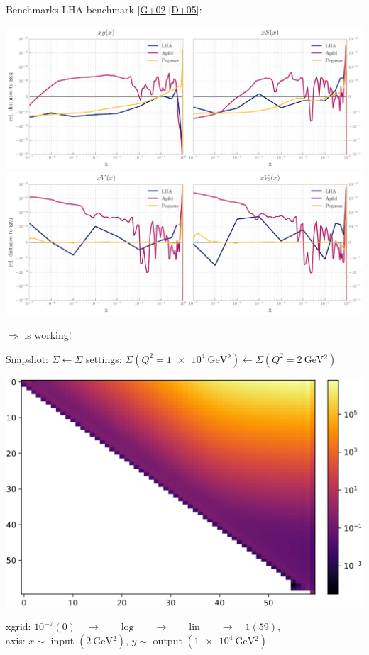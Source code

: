 \documentclass[10pt, usepdftitle=false]{beamer}
\providecommand{\iRef}[1]{{\color{mLightGreen}\small $[$#1$]$}}
\begin{document}
\begin{frame}{\eko{} Benchmarks}
	LHA benchmark \iRef{\href{https://arxiv.org/abs/hep-ph/0204316}{G+02}}\iRef{\href{https://arxiv.org/abs/hep-ph/0511119}{D+05}}:

	\begin{center}
		{\includegraphics[scale=0.5]{lha_bench_g_S.pdf}}%
	\quad%
		{\includegraphics[scale=0.5]{lha_bench_V_V3.pdf}}
	\end{center}

	$\Rightarrow$ \eko{} is working!
\end{frame}

\begin{frame}{\eko{} Snapshot: $\Sigma \leftarrow \Sigma$}
	\ffns{} \lo{} \lha{} settings: $\Sigma(Q^2=\SI{1e4}{\GeV^2}) \leftarrow \Sigma(Q^2=\SI{2}{\GeV^2})$

	\begin{center}
	\includegraphics[scale=.75]{SvS}
	\end{center}
	xgrid: $10^{-7} (0) \quad\to \qquad \text{log} \qquad \to \qquad \text{lin} \qquad \to \quad 1 (59)$,\\
	axis: $x \sim$ input $(\SI{2}{\GeV^2})$, $y \sim$ output $(\SI{1e4}{\GeV^2})$
\end{frame}
\end{document}
